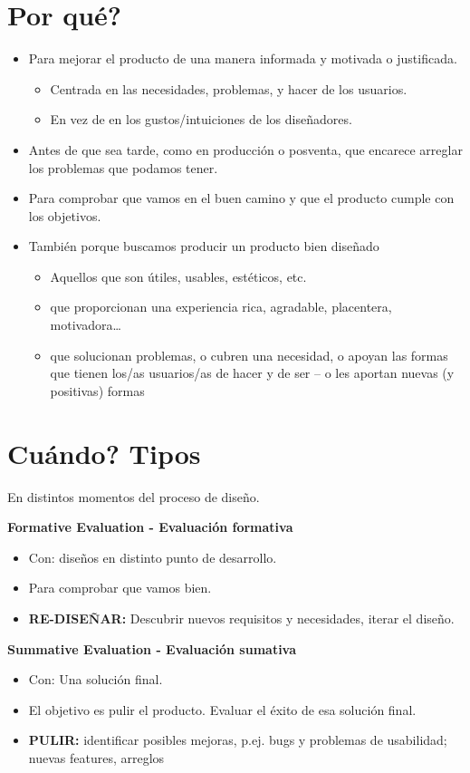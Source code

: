 \documentclass[12pt]{report} %
\begin{document}
\section{Por qué?}
\begin{itemize}
  \item Para mejorar el producto de una manera informada y motivada o justificada.
  \begin{itemize}
    \item Centrada en las necesidades, problemas, y hacer de los usuarios.
    \item En vez de en los gustos/intuiciones de los diseñadores.
  \end{itemize}
  \item Antes de que sea tarde, como en producción o posventa, que encarece arreglar los problemas que podamos tener.
  \item Para comprobar que vamos en el buen camino y que el producto cumple con los objetivos.
  \item También porque buscamos producir un producto bien diseñado
  \begin{itemize}
    \item Aquellos que son útiles, usables, estéticos, etc.
    \item que proporcionan una experiencia rica, agradable, placentera, motivadora\dots
    \item que solucionan problemas, o cubren una necesidad, o apoyan las formas que tienen los/as usuarios/as de hacer y de ser – o les aportan nuevas (y positivas) formas
  \end{itemize}
\end{itemize}

\section{Cuándo? Tipos}
En distintos momentos del proceso de diseño.

\textbf{Formative Evaluation - Evaluación formativa}
\begin{itemize}
  \item Con: diseños en distinto punto de desarrollo.
  \item Para comprobar que vamos bien.
  \item \textbf{RE-DISEÑAR:} Descubrir nuevos requisitos y necesidades, iterar el diseño.
\end{itemize}

\textbf{Summative Evaluation - Evaluación sumativa}
\begin{itemize}
  \item Con: Una solución final.
  \item El objetivo es pulir el producto. Evaluar el éxito de esa solución final.
  \item \textbf{PULIR:} identificar posibles mejoras, p.ej. bugs y problemas de usabilidad; nuevas features, arreglos
\end{itemize}
  
\end{document}
